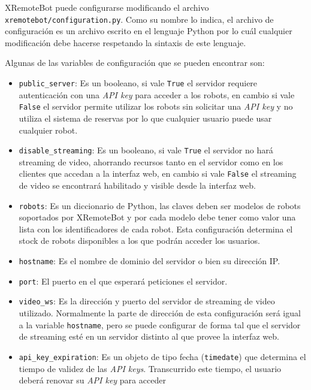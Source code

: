 XRemoteBot puede configurarse modificando el archivo
\texttt{xremotebot/configuration.py}. Como su nombre lo indica,
el archivo de configuración  es un archivo escrito en el lenguaje
Python por lo cuál cualquier modificación debe hacerse respetando
la sintaxis de este lenguaje.

Algunas de las variables de configuración que se pueden encontrar son:
\begin{itemize}
    \item \texttt{public\_server}: Es un booleano, si vale \texttt{True}
        el servidor requiere autenticación con una \textit{API key} para
        acceder a los robots, en cambio si vale \texttt{False} el servidor
        permite utilizar los robots sin solicitar una \textit{API key} y
        no utiliza el sistema de reservas por lo que cualquier usuario
        puede usar cualquier robot.
    \item \texttt{disable\_streaming}: Es un booleano, si vale \texttt{True}
        el servidor no hará streaming de video, ahorrando recursos tanto
        en el servidor como en los clientes que accedan a la interfaz web,
        en cambio si vale
        \texttt{False} el streaming de video se encontrará habilitado
        y visible desde la interfaz web.
    \item \texttt{robots}: Es un diccionario de Python, las claves
        deben ser modelos de robots soportados por XRemoteBot y por
        cada modelo debe tener como valor una lista con los identificadores
        de cada robot. Esta configuración determina el stock de robots
        disponibles a los que podrán acceder los usuarios.
    \item \texttt{hostname}: Es el nombre de dominio del servidor o bien
        su dirección IP.
    \item \texttt{port}: El puerto en el que esperará peticiones el
        servidor.
    \item \texttt{video\_ws}: Es la dirección y puerto del servidor de
        streaming de video utilizado. Normalmente la parte de
        dirección de esta configuración será igual a la variable
        \texttt{hostname}, pero se puede configurar de forma tal
        que el servidor de streaming esté en un servidor distinto
        al que provee la interfaz web.
    \item \texttt{api\_key\_expiration}: Es un objeto de tipo fecha
        (\texttt{timedate}) que determina el tiempo de validez
        de las \textit{API keys}. Transcurrido este tiempo, el
        usuario deberá renovar su \textit{API key} para acceder

\end{itemize}
